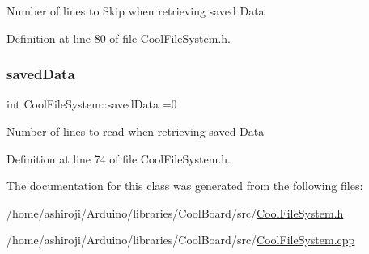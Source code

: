 Number of lines to Skip when retrieving saved Data 

Definition at line 80 of file Cool\+File\+System.\+h.

\mbox{\label{class_cool_file_system_ad9f5b739a32100f5f21270c3d9ee2b1d}} 
\subsubsection{\texorpdfstring{saved\+Data}{savedData}}
{\footnotesize\ttfamily int Cool\+File\+System\+::saved\+Data =0\hspace{0.3cm}{\ttfamily [private]}}

Number of lines to read when retrieving saved Data 

Definition at line 74 of file Cool\+File\+System.\+h.



The documentation for this class was generated from the following files\+:\begin{DoxyCompactItemize}
\item 
/home/ashiroji/\+Arduino/libraries/\+Cool\+Board/src/\hyperlink{_cool_file_system_8h}{Cool\+File\+System.\+h}\item 
/home/ashiroji/\+Arduino/libraries/\+Cool\+Board/src/\hyperlink{_cool_file_system_8cpp}{Cool\+File\+System.\+cpp}\end{DoxyCompactItemize}
